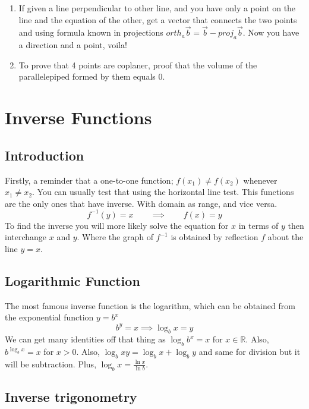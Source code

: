 \documentclass{article}
\begin{document}
\begin{enumerate}[1.]
	\item If given a line perpendicular to other line, and you have only a point on the line and the equation of the other, get a vector that connects the two points and using formula known in projections  
		$	orth_a \vec{ b } = \vec{ b } - proj_a \vec{ b }$. Now you have a direction and a point, voila!

		\item To prove that 4 points are coplaner, proof that the volume of the parallelepiped formed by them equals 0.

\end{enumerate}


\newpage

\section{Inverse Functions}

\subsection{Introduction}

Firstly, a reminder that a one-to-one function; $f(x_1) \neq f(x_2)$ whenever $ x_1 \neq x_2 $.
You can usually test that using the horizontal line test.
This functions are the only ones that have inverse. 
With domain as range, and vice versa.
\[
	f^{-1}(y)=x \qquad \implies \qquad  f(x)=y
\]
To find the inverse you will more likely solve the equation for $x$ in terms of $ y $ then interchange $ x $ and $ y $.
Where the graph of $ f^{-1} $ is obtained by reflection $f$ about  the line $y=x$.

\subsection{Logarithmic Function}

The most famous inverse function is the logarithm, which can be obtained from the exponential function $y=b^x$
\[
	b^y=x \implies \log_bx=y
\]
We can get many identities off that thing as $ \log_b{b^x}=x$ for $x \in \mathbb{R}$. Also, $b^{\log_b{x}}=x$ for $x>0$. Also, $\log_b{xy}=\log_bx+\log_by$ and same for division but it will be subtraction. Plus, $\log_b{x}= \frac{ \ln{x} }{ \ln{b} }.$

\subsection{Inverse trigonometry}
\end{document}
